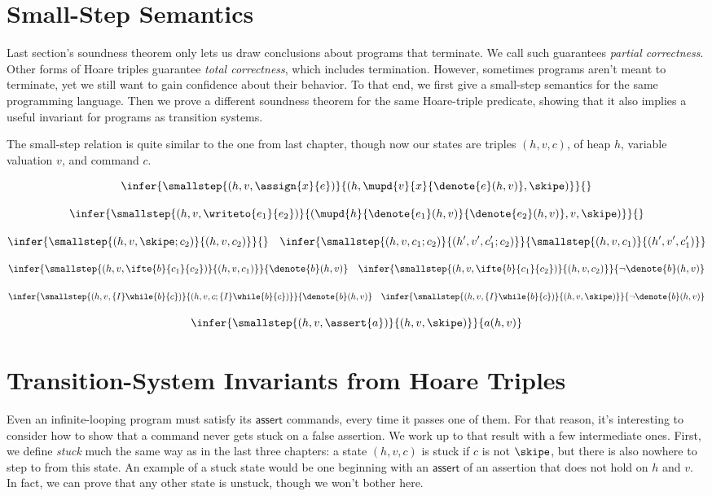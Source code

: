 \documentclass{amsbook}
\theoremstyle{definition}
\theoremstyle{remark}
\numberwithin{section}{chapter}
\numberwithin{equation}{chapter}
\begin{document}
\section{Small-Step Semantics}

Last section's soundness theorem only lets us draw conclusions about programs that terminate.
We call such guarantees \emph{partial correctness}.
Other forms of Hoare triples guarantee \emph{total correctness}, which includes termination.
However, sometimes programs aren't meant to terminate, yet we still want to gain confidence about their behavior.
To that end, we first give a small-step semantics for the same programming language.
Then we prove a different soundness theorem for the same Hoare-triple predicate, showing that it also implies a useful invariant for programs as transition systems.

The small-step relation is quite similar to the one from last chapter, though now our states are triples $(h, v, c)$, of heap $h$, variable valuation $v$, and command $c$.

\encoding
$$\infer{\smallstep{(h, v, \assign{x}{e})}{(h, \mupd{v}{x}{\denote{e}(h, v)}, \skipe)}}{}$$

$$\infer{\smallstep{(h, v, \writeto{e_1}{e_2})}{(\mupd{h}{\denote{e_1}(h, v)}{\denote{e_2}(h, v)}, v, \skipe)}}{}$$

$$\infer{\smallstep{(h, v, \skipe; c_2)}{(h, v, c_2)}}{}
\quad \infer{\smallstep{(h, v, c_1; c_2)}{(h', v', c'_1; c_2)}}{
  \smallstep{(h, v, c_1)}{(h', v', c'_1)}
}$$

$$\infer{\smallstep{(h, v, \ifte{b}{c_1}{c_2})}{(h, v, c_1)}}{
  \denote{b}(h, v)
}
\quad \infer{\smallstep{(h, v, \ifte{b}{c_1}{c_2})}{(h, v, c_2)}}{
  \neg \denote{b}(h, v)
}$$

$$\infer{\smallstep{(h, v, \{I\} \while{b}{c})}{(h, v, c; \{I\} \while{b}{c})}}{
  \denote{b}(h, v)
}
\quad \infer{\smallstep{(h, v, \{I\} \while{b}{c})}{(h, v, \skipe)}}{
  \neg \denote{b}(h, v)
}$$

$$\infer{\smallstep{(h, v, \assert{a})}{(h, v, \skipe)}}{
  a(h, v)
}$$


\section{Transition-System Invariants from Hoare Triples}

Even an infinite-looping program must satisfy its $\mathsf{assert}$ commands, every time it passes one of them.
For that reason, it's interesting to consider how to show that a command never gets stuck on a false assertion.
We work up to that result with a few intermediate ones.
First, we define \emph{stuck} much the same way as in the last three chapters: a state $(h, v, c)$ is stuck if $c$ is not $\skipe$, but there is also nowhere to step to from this state.
An example of a stuck state would be one beginning with an $\mathsf{assert}$ of an assertion that does not hold on $h$ and $v$.
In fact, we can prove that any other state is unstuck, though we won't bother here.
\end{document}
